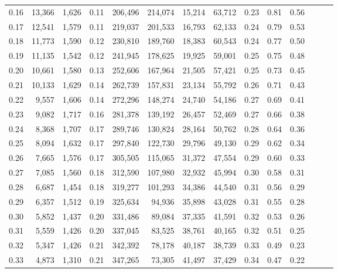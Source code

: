 \begin{tabular}{rrrrrrrrrrrrrr}
0.16 &  13,366 &  1,626 &  0.11 &  206,496 &  214,074 &  15,214 &  63,712 &  0.23 &  0.81 &      0.56 \\
0.17 &  12,541 &  1,579 &  0.11 &  219,037 &  201,533 &  16,793 &  62,133 &  0.24 &  0.79 &      0.53 \\
0.18 &  11,773 &  1,590 &  0.12 &  230,810 &  189,760 &  18,383 &  60,543 &  0.24 &  0.77 &      0.50 \\
0.19 &  11,135 &  1,542 &  0.12 &  241,945 &  178,625 &  19,925 &  59,001 &  0.25 &  0.75 &      0.48 \\
0.20 &  10,661 &  1,580 &  0.13 &  252,606 &  167,964 &  21,505 &  57,421 &  0.25 &  0.73 &      0.45 \\
0.21 &  10,133 &  1,629 &  0.14 &  262,739 &  157,831 &  23,134 &  55,792 &  0.26 &  0.71 &      0.43 \\
0.22 &   9,557 &  1,606 &  0.14 &  272,296 &  148,274 &  24,740 &  54,186 &  0.27 &  0.69 &      0.41 \\
0.23 &   9,082 &  1,717 &  0.16 &  281,378 &  139,192 &  26,457 &  52,469 &  0.27 &  0.66 &      0.38 \\
0.24 &   8,368 &  1,707 &  0.17 &  289,746 &  130,824 &  28,164 &  50,762 &  0.28 &  0.64 &      0.36 \\
0.25 &   8,094 &  1,632 &  0.17 &  297,840 &  122,730 &  29,796 &  49,130 &  0.29 &  0.62 &      0.34 \\
0.26 &   7,665 &  1,576 &  0.17 &  305,505 &  115,065 &  31,372 &  47,554 &  0.29 &  0.60 &      0.33 \\
0.27 &   7,085 &  1,560 &  0.18 &  312,590 &  107,980 &  32,932 &  45,994 &  0.30 &  0.58 &      0.31 \\
0.28 &   6,687 &  1,454 &  0.18 &  319,277 &  101,293 &  34,386 &  44,540 &  0.31 &  0.56 &      0.29 \\
0.29 &   6,357 &  1,512 &  0.19 &  325,634 &   94,936 &  35,898 &  43,028 &  0.31 &  0.55 &      0.28 \\
0.30 &   5,852 &  1,437 &  0.20 &  331,486 &   89,084 &  37,335 &  41,591 &  0.32 &  0.53 &      0.26 \\
0.31 &   5,559 &  1,426 &  0.20 &  337,045 &   83,525 &  38,761 &  40,165 &  0.32 &  0.51 &      0.25 \\
0.32 &   5,347 &  1,426 &  0.21 &  342,392 &   78,178 &  40,187 &  38,739 &  0.33 &  0.49 &      0.23 \\
0.33 &   4,873 &  1,310 &  0.21 &  347,265 &   73,305 &  41,497 &  37,429 &  0.34 &  0.47 &      0.22 \\

\end{tabular}
